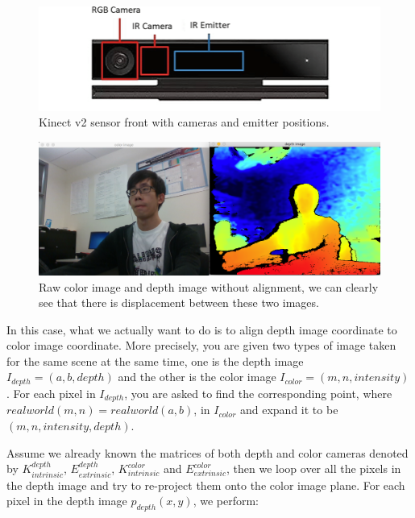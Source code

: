 \begin{figure}
    \includegraphics[width=\linewidth]{figures/framework_kinectv2.png}
    \caption{Kinect v2 sensor front with cameras and emitter positions.}
    \label{fig:fw-kinectv2}
\end{figure}

\begin{figure}
    \includegraphics[width=\linewidth]{figures/framework_raw_images.png}
    \caption[Example without alignment]
    {Raw color image and depth image without alignment, we can clearly
        see that there is displacement between these two images.}
    \label{fig:fw-raw-image}
\end{figure}

In this case, what we actually want to do is to align depth image coordinate to
color image coordinate. More precisely, you are given two types of  image taken
for the same scene at the same time, one is the depth image $I_{depth} = (a, b,
depth)$ and the other is the color image $I_{color} = (m, n, intensity)$. For
each pixel in $I_{depth}$, you are asked to find the corresponding point, where
$realworld(m, n) = realworld(a, b)$, in
$I_{color}$ and expand it to be $(m, n, intensity, depth)$.

Assume we already known the matrices of both depth and color cameras denoted by
$K_{intrinsic}^{depth}$, $E_{extrinsic}^{depth}$, $K_{intrinsic}^{color}$ and
$E_{extrinsic}^{color}$, then we loop over all the pixels in the depth image and
try to re-project them onto the color image plane. For each pixel in the depth
image $p_{depth}(x, y)$, we perform:

